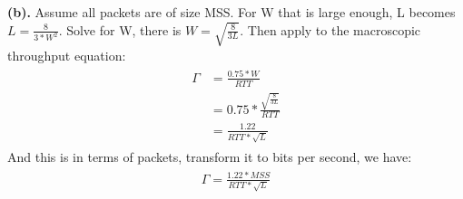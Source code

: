 \documentclass[titlepage, paper=a4, fontsize=11pt]{scrartcl} %
\numberwithin{equation}{section} %
\numberwithin{table}{section} %
\begin{document}
\textbf{(b).}
Assume all packets are of size MSS. For W that is large enough, L becomes $L=\frac{8}{3*W^2}$.
Solve for W, there is $W=\sqrt{\frac{8}{3L}}$. Then apply to the macroscopic throughput equation:
\begin{align*} 
\begin{split}
\Gamma &= \frac{0.75*W}{RTT} \\
&= 0.75 * \frac{\sqrt{\frac{8}{3L}}}{RTT} \\
&= \frac{1.22}{RTT*\sqrt{L}}
\end{split}					
\end{align*}
And this is in terms of packets, transform it to bits per second, we have:
\begin{align*} 
\begin{split}
\Gamma = \frac{1.22*MSS}{RTT*\sqrt{L}}
\end{split}					
\end{align*}
\\


\end{document}

